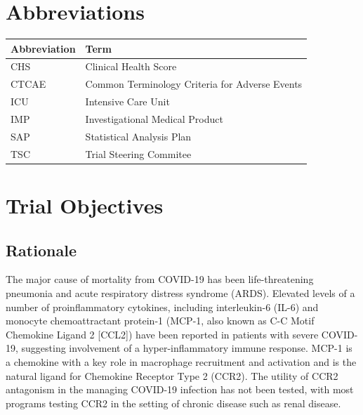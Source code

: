 \documentclass[11pt,parskip=half-]{scrartcl}
\begin{document}
\section*{Abbreviations}

\begin{table}[H]
    \begin{center}
        \begin{tabular}{ll}
            \hline 
            Abbreviation & Term \\
            \hline 
            CHS & Clinical Health Score \\
            CTCAE & Common Terminology Criteria for Adverse Events \\
            ICU & Intensive Care Unit \\
            IMP & Investigational Medical Product \\
            SAP & Statistical Analysis Plan \\
            TSC & Trial Steering Commitee \\
            \hline
        \end{tabular}
    \end{center}
\end{table}

\clearpage

\section{Trial Objectives}

\subsection{Rationale}
The major cause of mortality from COVID-19 has been life-threatening pneumonia and acute respiratory distress syndrome (ARDS). Elevated levels of a number of proinflammatory cytokines, including interleukin-6 (IL-6) and monocyte chemoattractant protein-1 (MCP-1, also known as C-C Motif Chemokine Ligand 2 [CCL2]) have been reported in patients with severe COVID-19, suggesting involvement of a hyper-inflammatory immune response. MCP-1 is a chemokine with a key role in macrophage recruitment and activation and is the natural ligand for Chemokine Receptor Type 2 (CCR2). The utility of CCR2 antagonism in the managing COVID-19 infection has not been tested, with most programs testing CCR2 in the setting of chronic disease such as renal disease.
\end{document}
